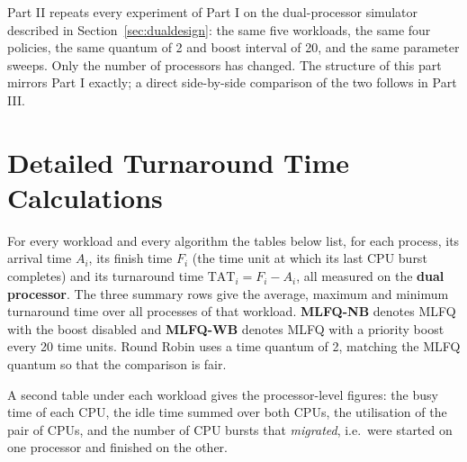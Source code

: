 \documentclass[11pt,a4paper]{article}
\begin{document}
Part II repeats every experiment of Part I on the dual-processor simulator described in
Section~\ref{sec:dualdesign}: the same five workloads, the same four policies, the same quantum of 2 and
boost interval of 20, and the same parameter sweeps. Only the number of processors has
changed. The structure of this part mirrors Part I exactly; a direct side-by-side
comparison of the two follows in Part III.

\section{Detailed Turnaround Time Calculations}

For every workload and every algorithm the tables below list, for each process, its
arrival time $A_i$, its finish time $F_i$ (the time unit at which its last CPU burst
completes) and its turnaround time $\mathrm{TAT}_i = F_i - A_i$, all measured on the
\textbf{dual processor}. The three summary rows give the average, maximum and minimum turnaround
time over all processes of that workload. \textbf{MLFQ-NB} denotes MLFQ with the boost
disabled and \textbf{MLFQ-WB} denotes MLFQ with a priority boost every 20 time units.
Round Robin uses a time quantum of 2, matching the MLFQ quantum so that the comparison is
fair.

A second table under each workload gives the processor-level figures: the busy time of
each CPU, the idle time summed over both CPUs, the utilisation of the pair of CPUs, and
the number of CPU bursts that \emph{migrated}, i.e.\ were started on one processor and
finished on the other.
\end{document}
